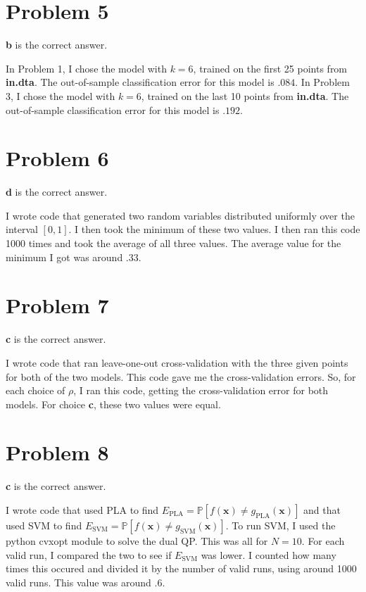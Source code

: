 \documentclass{article}
\begin{document}
\section*{Problem 5}
\textbf{b} is the correct answer.

\noindent In Problem 1, I chose the model with $k = 6$, trained on the first
25 points from \textbf{in.dta}. The out-of-sample classification error for
this model is $.084$. In Problem 3, I chose the model with $k = 6$, trained on
the last 10 points from \textbf{in.dta}. The out-of-sample classification error
for this model is $.192$.

\section*{Problem 6}
\textbf{d} is the correct answer.

\noindent I wrote code that generated two random variables distributed uniformly
over the interval $[0,1]$. I then took the minimum of these two values. I then ran
this code 1000 times and took the average of all three values. The average value
for the minimum I got was around $.33$.

\section*{Problem 7}
\textbf{c} is the correct answer.

\noindent I wrote code that ran leave-one-out cross-validation with the three
given points for both of the two models. This code gave me the cross-validation
errors. So, for each choice of $\rho$, I ran this code, getting the cross-validation
error for both models. For choice \textbf{c}, these two values were equal.

\section*{Problem 8}
\textbf{c} is the correct answer.

\noindent I wrote code that used PLA to find
$E_{\text{PLA}} = \mathbb{P}[f(\mathbf{x}) \neq g_{\text{PLA}}(\mathbf{x})]$
and that used SVM to find
$E_{\text{SVM}} = \mathbb{P}[f(\mathbf{x}) \neq g_{\text{SVM}}(\mathbf{x})]$.
To run SVM, I used the python cvxopt module to solve the dual QP.
This was all for $N = 10$.  For each valid run, I compared the two to see
if $E_{\text{SVM}}$ was lower. I counted how many times this occured and divided
it by the number of valid runs, using around 1000 valid runs. This value was
around $.6$.
\end{document}
